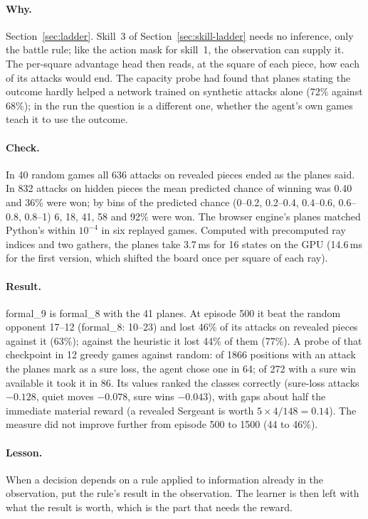 \paragraph{Why.} Section~\ref{sec:ladder}. Skill~3 of Section~\ref{sec:skill-ladder} needs no
inference, only the battle rule; like the action mask for skill~1, the observation can supply it.
The per-square advantage head then reads, at the square of each piece, how each of its attacks
would end. The capacity probe had found that planes stating the outcome hardly helped a network
trained on synthetic attacks alone (72\% against 68\%); in the run the question is a different
one, whether the agent's own games teach it to use the outcome.

\paragraph{Check.} In 40 random games all 636 attacks on revealed pieces ended as the planes said.
In 832 attacks on hidden pieces the mean predicted chance of winning was 0.40 and 36\% were won;
by bins of the predicted chance (0--0.2, 0.2--0.4, 0.4--0.6, 0.6--0.8, 0.8--1) 6, 18, 41, 58 and 92\%
were won. The browser engine's planes matched Python's within $10^{-4}$ in six replayed games.
Computed with precomputed ray indices and two gathers, the planes take 3.7\,ms for 16 states on
the GPU (14.6\,ms for the first version, which shifted the board once per square of each ray).

\paragraph{Result.} formal\_9 is formal\_8 with the 41 planes. At episode 500 it beat the random
opponent 17--12 (formal\_8: 10--23) and lost 46\% of its attacks on revealed pieces against it
(63\%); against the heuristic it lost 44\% of them (77\%). A probe of that checkpoint in 12 greedy
games against random: of 1866 positions with an attack the planes mark as a sure loss, the agent
chose one in 64; of 272 with a sure win available it took it in 86. Its values ranked the classes
correctly (sure-loss attacks $-0.128$, quiet moves $-0.078$, sure wins $-0.043$), with gaps about
half the immediate material reward (a revealed Sergeant is worth $5 \times 4/148 = 0.14$). The
measure did not improve further from episode 500 to 1500 (44 to 46\%).

\paragraph{Lesson.} When a decision depends on a rule applied to information already in the
observation, put the rule's result in the observation. The learner is then left with what the
result is worth, which is the part that needs the reward.

